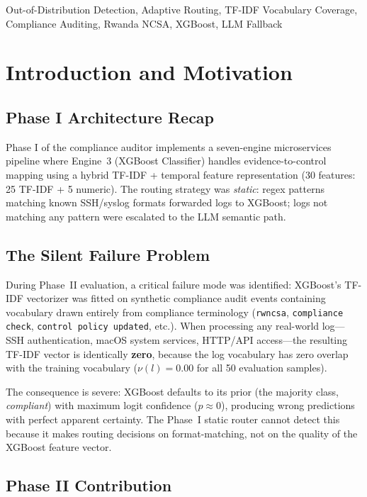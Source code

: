 \documentclass[11pt,conference]{IEEEtran}
\begin{document}
\begin{IEEEkeywords}
Out-of-Distribution Detection, Adaptive Routing, TF-IDF Vocabulary Coverage,
Compliance Auditing, Rwanda NCSA, XGBoost, LLM Fallback
\end{IEEEkeywords}

\section{Introduction and Motivation}

\subsection{Phase I Architecture Recap}

Phase I of the compliance auditor implements a seven-engine microservices
pipeline where Engine~3 (XGBoost Classifier) handles evidence-to-control
mapping using a hybrid TF-IDF + temporal feature representation
(30 features: 25 TF-IDF + 5 numeric). The routing strategy was \emph{static}:
regex patterns matching known SSH/syslog formats forwarded logs to XGBoost;
logs not matching any pattern were escalated to the LLM semantic path.

\subsection{The Silent Failure Problem}

During Phase~II evaluation, a critical failure mode was identified:
XGBoost's TF-IDF vectorizer was fitted on synthetic compliance audit events
containing vocabulary drawn entirely from compliance terminology
(\texttt{rwncsa}, \texttt{compliance check}, \texttt{control policy updated},
etc.). When processing any real-world log---SSH authentication, macOS system
services, HTTP/API access---the resulting TF-IDF vector is identically
\textbf{zero}, because the log vocabulary has zero overlap with the training
vocabulary ($\nu(l) = 0.00$ for all 50 evaluation samples).

The consequence is severe: XGBoost defaults to its prior (the majority class,
\emph{compliant}) with maximum logit confidence ($p \approx 0$), producing
wrong predictions with perfect apparent certainty. The Phase~I static router
cannot detect this because it makes routing decisions on format-matching, not
on the quality of the XGBoost feature vector.

\subsection{Phase II Contribution}
\end{document}
